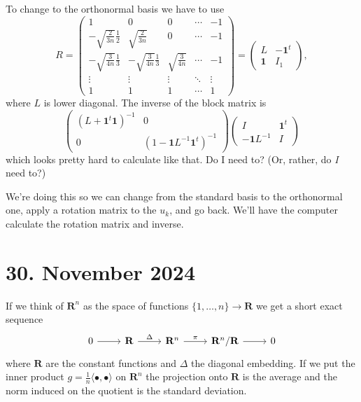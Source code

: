 \documentclass[11pt]{amsart}
\theoremstyle{definition}
\def\RR{\mathbf{R}}
\def\<{\langle}
\def\>{\rangle}
\begin{document}
To change to the orthonormal basis we have to use
\def\tmpn#1#2{\sqrt{\frac{#1}{#2 n}}}
\[
R = \begin{pmatrix}
1 & 0 & 0 & \cdots & -1
\\
-\tmpn23 \frac12 & \tmpn23 & 0 & \cdots & -1
\\
-\tmpn34 \frac13 & -\tmpn34 \frac13 & \tmpn34  & \cdots & -1
\\
\vdots & \vdots & \vdots & \ddots & \vdots
\\
1 & 1 & 1 & \cdots & 1
\end{pmatrix}
= \begin{pmatrix}
L & -\mathbf{1}^t
\\
\mathbf{1} & I_1
\end{pmatrix},
\]
where $L$ is lower diagonal.
The inverse of the block matrix is
\[
\begin{pmatrix}
(L + \mathbf{1}^t \mathbf{1})^{-1}
& 0
\\
0 & (1 - \mathbf{1} L^{-1} \mathbf{1}^t)^{-1}
\end{pmatrix}
\begin{pmatrix}
I & \mathbf{1}^t
\\
-\mathbf{1} L^{-1} & I
\end{pmatrix}
\]
which looks pretty hard to calculate like that.
Do I need to? (Or, rather, do \emph{I} need to?)

We're doing this so we can change from the standard basis to the orthonormal one, apply a rotation matrix to the $u_k$, and go back.
We'll have the computer calculate the rotation matrix and inverse.

\section{30. November 2024}

If we think of $\RR^n$ as the space of functions $\{1, \ldots, n\} \to \RR$ we get a short exact sequence
\[
\begin{tikzcd}
0 \ar[r] &
\RR \ar[r,"\Delta"] &
\RR^n \ar[r,"\pi"] &
\RR^n / \RR \ar[r] &
0
\end{tikzcd}
\]
where $\RR$ are the constant functions and $\Delta$ the diagonal embedding.
If we put the inner product $g = \frac 1n \< \bullet, \bullet \>$ on $\RR^n$ the projection onto $\RR$ is the average and the norm induced on the quotient is the standard deviation.
\end{document}
